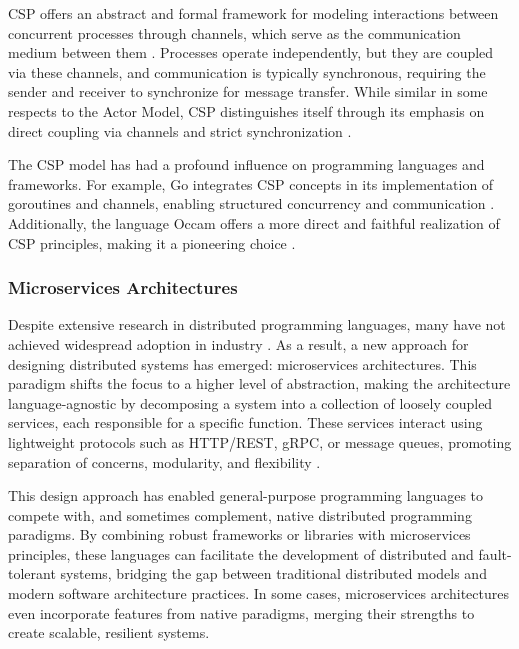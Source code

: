 
\gls{CSP} offers an abstract and formal framework for modeling interactions between concurrent processes through channels, which serve as the communication medium between them \cite{Paduraru2018}. Processes operate independently, but they are coupled via these channels, and communication is typically synchronous, requiring the sender and receiver to synchronize for message transfer. While similar in some respects to the Actor Model, \gls{CSP} distinguishes itself through its emphasis on direct coupling via channels and strict synchronization \cite{}.

The \gls{CSP} model has had a profound influence on programming languages and frameworks. For example, Go integrates \gls{CSP} concepts in its implementation of goroutines and channels, enabling structured concurrency and communication \cite{go-docs, Valkov2018}. Additionally, the language Occam offers a more direct and faithful realization of \gls{CSP} principles, making it a pioneering choice \cite{Brolos2021}.

\subsubsection{Microservices Architectures}

Despite extensive research in distributed programming languages, many have not achieved widespread adoption in industry \cite{}. As a result, a new approach for designing distributed systems has emerged: microservices architectures. This paradigm shifts the focus to a higher level of abstraction, making the architecture language-agnostic by decomposing a system into a collection of loosely coupled services, each responsible for a specific function. These services interact using lightweight protocols such as HTTP/REST, gRPC, or message queues, promoting separation of concerns, modularity, and flexibility \cite{Fowler2014}.

This design approach has enabled general-purpose programming languages to compete with, and sometimes complement, native distributed programming paradigms. By combining robust frameworks or libraries with microservices principles, these languages can facilitate the development of distributed and fault-tolerant systems, bridging the gap between traditional distributed models and modern software architecture practices. In some cases, microservices architectures even incorporate features from native paradigms, merging their strengths to create scalable, resilient systems.

